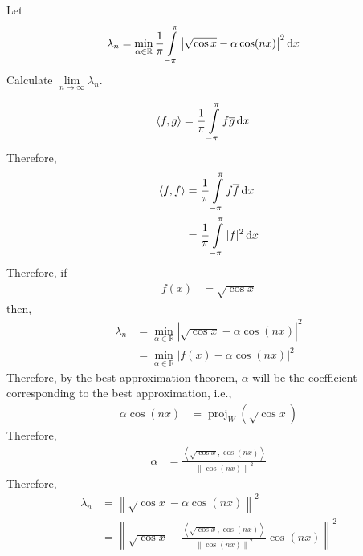 \documentclass[fleqn, a4paper, 12pt, twoside]{article}
\theoremstyle{definition}
\theoremstyle{theorem}
\DeclareMathOperator{\proj}{proj}
\begin{document}
\begin{question}
	Let
	\begin{align*}
		\lambda_n & = \min\limits_{\alpha \in \mathbb{R}} \frac{1}{\pi} \int\limits_{-\pi}^{\pi} \left| \sqrt{\cos x} - \alpha \cos(n x) \right|^2 \dif x
	\end{align*}
	Calculate $\lim\limits_{n \to \infty} \lambda_n$.
\end{question}

\begin{solution}
	\begin{align*}
		\langle f,g \rangle & = \frac{1}{\pi} \int\limits_{-\pi}^{\pi} f \overline{g} \dif x
	\end{align*}
	Therefore,
	\begin{align*}
		\langle f,f \rangle & = \frac{1}{\pi} \int\limits_{-\pi}^{\pi} f \overline{f} \dif x \\
                                    & = \frac{1}{\pi} \int\limits_{-\pi}^{\pi} |f|^2 \dif x
	\end{align*}
	Therefore, if
	\begin{align*}
		f(x) & = \sqrt{\cos x}
	\end{align*}
	then,
	\begin{align*}
		\lambda_n & = \min\limits_{\alpha \in \mathbb{R}} \left| \sqrt{\cos x} - \alpha \cos(n x) \right|^2 \\
                          & = \min\limits_{\alpha \in \mathbb{R}} \left| f(x) - \alpha \cos(n x) \right|^2
	\end{align*}
	Therefore, by the best approximation theorem, $\alpha$ will be the coefficient corresponding to the best approximation, i.e.,
	\begin{align*}
		\alpha \cos(n x) & = \proj_{W}\left( \sqrt{\cos x} \right)
	\end{align*}
	Therefore,
	\begin{align*}
		\alpha & = \frac{\left\langle \sqrt{\cos x},\cos(n x) \right\rangle}{\left\| \cos(n x) \right\|^2}
	\end{align*}
	Therefore,
	\begin{align*}
		\lambda_n & = \left\| \sqrt{\cos x} - \alpha \cos(n x) \right\|^2                                                                                                       \\
                          & = \left\| \sqrt{\cos x} - \frac{\left\langle \sqrt{\cos x},\cos(n x) \right\rangle}{\left\| \cos(n x) \right\|^2} \cos(n x) \right\|^2                      \\

\end{align*}
\end{solution}
\end{document}
